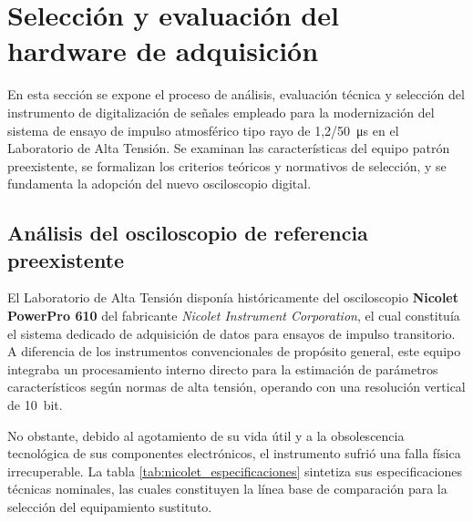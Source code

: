 \section{Selección y evaluación del hardware de adquisición} \label{sec:seleccion_hardware}

En esta sección se expone el proceso de análisis, evaluación técnica y selección del instrumento de digitalización de señales empleado para la modernización del sistema de ensayo de impulso atmosférico tipo rayo de \qty[parse-numbers=false]{1,2/50}{\micro\second} en el Laboratorio de Alta Tensión. Se examinan las características del equipo patrón preexistente, se formalizan los criterios teóricos y normativos de selección, y se fundamenta la adopción del nuevo osciloscopio digital.

\subsection{Análisis del osciloscopio de referencia preexistente} \label{subsec:nicolet_referencia}

El Laboratorio de Alta Tensión disponía históricamente del osciloscopio \textbf{Nicolet PowerPro 610} del fabricante \emph{Nicolet Instrument Corporation}, el cual constituía el sistema dedicado de adquisición de datos para ensayos de impulso transitorio. A diferencia de los instrumentos convencionales de propósito general, este equipo integraba un procesamiento interno directo para la estimación de parámetros característicos según normas de alta tensión, operando con una resolución vertical de \qty{10}{bit}.

No obstante, debido al agotamiento de su vida útil y a la obsolescencia tecnológica de sus componentes electrónicos, el instrumento sufrió una falla física irrecuperable. La tabla \ref{tab:nicolet_especificaciones} sintetiza sus especificaciones técnicas nominales, las cuales constituyen la línea base de comparación para la selección del equipamiento sustituto.

